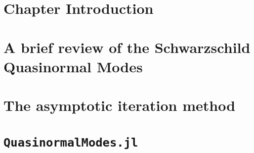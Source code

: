 \section{Chapter Introduction}
\label{ch:qnm_aim:sec:intro}


\section{A brief review of the Schwarzschild Quasinormal Modes}
\label{ch:qnm_aim:sec:penrose_review}


\section{The asymptotic iteration method}
\label{ch:qnm_aim:sec:mp_penrose}


\section{\texttt{QuasinormalModes.jl}}
\label{ch:qnm_aim:sec:cmmr_penrose}

